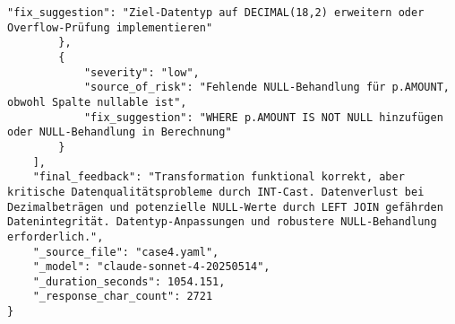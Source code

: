 \begin{lstlisting}[caption={Ausgabe: Claude Sonnet 4 Anwendungsfall 4 Hauptdurchlauf},label={claude_case4_prompt1}]
            "fix_suggestion": "Ziel-Datentyp auf DECIMAL(18,2) erweitern oder Overflow-Prüfung implementieren"
        },
        {
            "severity": "low",
            "source_of_risk": "Fehlende NULL-Behandlung für p.AMOUNT, obwohl Spalte nullable ist",
            "fix_suggestion": "WHERE p.AMOUNT IS NOT NULL hinzufügen oder NULL-Behandlung in Berechnung"
        }
    ],
    "final_feedback": "Transformation funktional korrekt, aber kritische Datenqualitätsprobleme durch INT-Cast. Datenverlust bei Dezimalbeträgen und potenzielle NULL-Werte durch LEFT JOIN gefährden Datenintegrität. Datentyp-Anpassungen und robustere NULL-Behandlung erforderlich.",
    "_source_file": "case4.yaml",
    "_model": "claude-sonnet-4-20250514",
    "_duration_seconds": 1054.151,
    "_response_char_count": 2721
}
\end{lstlisting}

